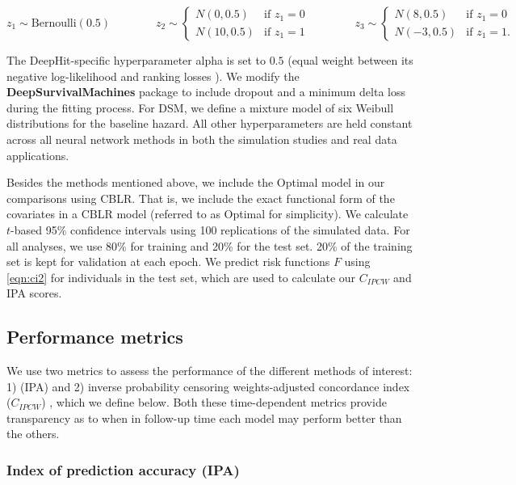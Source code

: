 \documentclass[AMA,STIX1COL,]{WileyNJD-v2}
\begin{document}
\[
z_{1} \sim \textrm{Bernoulli}(0.5) \qquad \qquad
z_{2} \sim \begin{cases}
 N(0,0.5) & \textrm{if } z_{1}=0\\ 
 N(10,0.5) & \textrm{if } z_{1}=1
\end{cases} \qquad \qquad
z_{3} \sim \begin{cases}
 N(8,0.5) & \textrm{if } z_{1}=0\\ 
 N(-3,0.5) & \textrm{if } z_{1}=1.
\end{cases}
\]

The DeepHit-specific hyperparameter alpha is set to \(0.5\) (equal
weight between its negative log-likelihood and ranking losses
\citep{lee2018DeepHit}). We modify the \textbf{DeepSurvivalMachines}
\citep{dsmPaper} package to include dropout and a minimum delta loss
during the fitting process. For DSM, we define a mixture model of six
Weibull distributions for the baseline hazard. All other hyperparameters
are held constant across all neural network methods in both the
simulation studies and real data applications.

Besides the methods mentioned above, we include the Optimal model in our
comparisons using CBLR. That is, we include the exact functional form of
the covariates in a CBLR model (referred to as Optimal for simplicity).
We calculate \(t\)-based 95\% confidence intervals using 100
replications of the simulated data. For all analyses, we use 80\% for
training and 20\% for the test set. 20\% of the training set is kept for
validation at each epoch. We predict risk functions \(F\) using
\eqref{eqn:ci2} for individuals in the test set, which are used to
calculate our \(C_{IPCW}\) and IPA scores.

\hypertarget{performance-metrics}{%
\subsection{Performance metrics}\label{performance-metrics}}

We use two metrics to assess the performance of the different methods of
interest: 1) (IPA) \citep{kattan2018index} and 2) inverse probability
censoring weights-adjusted concordance index (\(C_{IPCW}\))
\citep{uno2011}, which we define below. Both these time-dependent
metrics provide transparency as to when in follow-up time each model may
perform better than the others.

\hypertarget{index-of-prediction-accuracy-ipa}{%
\subsubsection{Index of prediction accuracy
(IPA)}\label{index-of-prediction-accuracy-ipa}}
\end{document}
